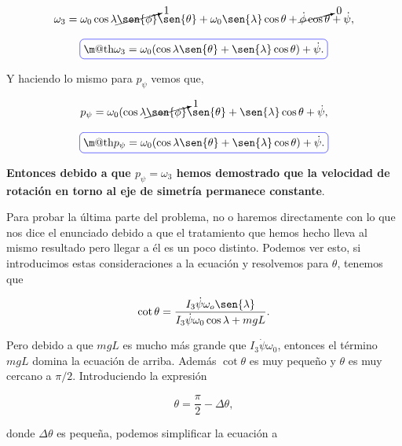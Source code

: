 \documentclass[a4paper,10pt]{article}
\makeatletter
\numberwithin{equation}{section}
\newcommand*{\boxcolor}{blue}
\renewcommand{\boxed}[1]{\textcolor{\boxcolor}{%
\tikz[baseline={([yshift=-1ex]current bounding box.center)}] \node [rectangle, minimum width=1ex,rounded corners,draw] {\normalcolor\m@th$\displaystyle#1$};}}
\makeatother
\begin{document}
\begin{equation}
 \omega_3 = \omega_0\cos{\lambda}\cancelto{1}{\sen{\phi}}\sen{\theta} + \omega_0\sen{\lambda}\cos{\theta} + 
 \cancelto{0}{\dot{\phi}\cos{\theta}} + \dot{\psi},
\end{equation}

\begin{equation}
 \boxed{\omega_3 = \omega_0(\cos{\lambda}\sen{\theta} + \sen{\lambda}\cos{\theta}) + \dot{\psi}.}
\end{equation}

Y haciendo lo mismo para $p_\psi$ vemos que,

\begin{equation}
 p_\psi = \omega_0(\cos{\lambda}\cancelto{1}{\sen{\phi}}\sen{\theta}+ 
 \sen{\lambda}\cos{\theta} + \dot{\psi},
\end{equation}

\begin{equation}
 \boxed{p_\psi = \omega_0(\cos{\lambda}\sen{\theta} + \sen{\lambda}\cos{\theta}) + \dot{\psi}.}
\end{equation}

\textbf{Entonces debido a que $p_\psi = \omega_3$ hemos demostrado que la velocidad de rotación 
en torno al eje de simetría permanece constante}.

\vspace{.3cm}

Para probar la última parte del problema, no o haremos directamente con lo que nos dice 
el enunciado debido a que el tratamiento que hemos hecho lleva al mismo resultado 
pero llegar a él es un poco distinto. Podemos ver esto, si introducimos estas consideraciones a la ecuación 
 y resolvemos para $\theta$, tenemos que 

\begin{equation}
 \cot{\theta} = \frac{I_3\dot{\psi}\omega_o\sen{\lambda}}{I_3\dot{\psi}\omega_0\cos{\lambda} + mgL}.
\label{eq:cotangenteTheta}
\end{equation}

Pero debido a que $mgL$ es mucho más grande que $I_3\dot{\psi}\omega_0$, entonces el término 
$mgL$ domina la ecuación de arriba. Además $\cot{\theta}$ es muy pequeño y $\theta$ es 
muy cercano a $\pi/2$. Introduciendo la expresión

\begin{equation}
 \theta = \frac{\pi}{2} - \Delta\theta,
\end{equation}

donde $\Delta\theta$ es pequeña, podemos simplificar la ecuación 
a 
\end{document}
